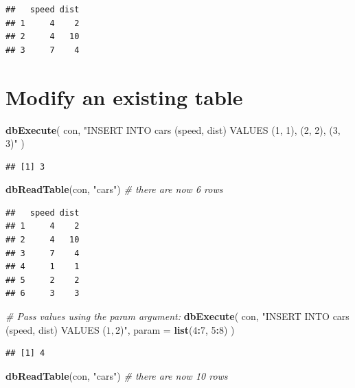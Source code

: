 \documentclass[]{book}
\newenvironment{Shaded}{\begin{snugshade}}{\end{snugshade}}
\newcommand{\CommentTok}[1]{\textcolor[rgb]{0.56,0.35,0.01}{\textit{#1}}}
\newcommand{\DataTypeTok}[1]{\textcolor[rgb]{0.13,0.29,0.53}{#1}}
\newcommand{\DecValTok}[1]{\textcolor[rgb]{0.00,0.00,0.81}{#1}}
\newcommand{\KeywordTok}[1]{\textcolor[rgb]{0.13,0.29,0.53}{\textbf{#1}}}
\newcommand{\NormalTok}[1]{#1}
\newcommand{\OperatorTok}[1]{\textcolor[rgb]{0.81,0.36,0.00}{\textbf{#1}}}
\newcommand{\StringTok}[1]{\textcolor[rgb]{0.31,0.60,0.02}{#1}}
\theoremstyle{definition}
\theoremstyle{definition}
\theoremstyle{definition}
\theoremstyle{remark}
\begin{document}
\begin{verbatim}
##   speed dist
## 1     4    2
## 2     4   10
## 3     7    4
\end{verbatim}

\hypertarget{modify-an-existing-table}{%
\section{Modify an existing table}\label{modify-an-existing-table}}

\begin{Shaded}
\begin{Highlighting}[]
\KeywordTok{dbExecute}\NormalTok{(}
\NormalTok{  con,}
  \StringTok{"INSERT INTO cars (speed, dist) VALUES (1, 1), (2, 2), (3, 3)"}
\NormalTok{)}
\end{Highlighting}
\end{Shaded}

\begin{verbatim}
## [1] 3
\end{verbatim}

\begin{Shaded}
\begin{Highlighting}[]
\KeywordTok{dbReadTable}\NormalTok{(con, }\StringTok{"cars"}\NormalTok{)   }\CommentTok{# there are now 6 rows}
\end{Highlighting}
\end{Shaded}

\begin{verbatim}
##   speed dist
## 1     4    2
## 2     4   10
## 3     7    4
## 4     1    1
## 5     2    2
## 6     3    3
\end{verbatim}

\begin{Shaded}
\begin{Highlighting}[]
\CommentTok{# Pass values using the param argument:}
\KeywordTok{dbExecute}\NormalTok{(}
\NormalTok{  con,}
  \StringTok{"INSERT INTO cars (speed, dist) VALUES ($1, $2)"}\NormalTok{,}
  \DataTypeTok{param =} \KeywordTok{list}\NormalTok{(}\DecValTok{4}\OperatorTok{:}\DecValTok{7}\NormalTok{, }\DecValTok{5}\OperatorTok{:}\DecValTok{8}\NormalTok{)}
\NormalTok{)}
\end{Highlighting}
\end{Shaded}

\begin{verbatim}
## [1] 4
\end{verbatim}

\begin{Shaded}
\begin{Highlighting}[]
\KeywordTok{dbReadTable}\NormalTok{(con, }\StringTok{"cars"}\NormalTok{)   }\CommentTok{# there are now 10 rows}
\end{Highlighting}
\end{Shaded}
\end{document}
